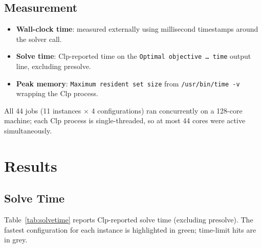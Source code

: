\documentclass[11pt,a4paper]{article}
\begin{document}
\subsection{Measurement}

\begin{itemize}
  \item \textbf{Wall-clock time}: measured externally using millisecond
        timestamps around the solver call.
  \item \textbf{Solve time}: Clp-reported time on the
        \texttt{Optimal objective \ldots\ time} output line, excluding
        presolve.
  \item \textbf{Peak memory}: \texttt{Maximum resident set size} from
        \texttt{/usr/bin/time -v} wrapping the Clp process.
\end{itemize}

All 44 jobs (11 instances $\times$ 4 configurations) ran concurrently on a
128-core machine; each Clp process is single-threaded, so at most 44 cores
were active simultaneously.

\section{Results}

\subsection{Solve Time}
\label{sec:solvetime}

Table~\ref{tab:solvetime} reports Clp-reported solve time (excluding
presolve).  The fastest configuration for each instance is highlighted in
\colorbox{bestcell}{green}; time-limit hits are in \colorbox{tlcell}{grey}.
\end{document}
